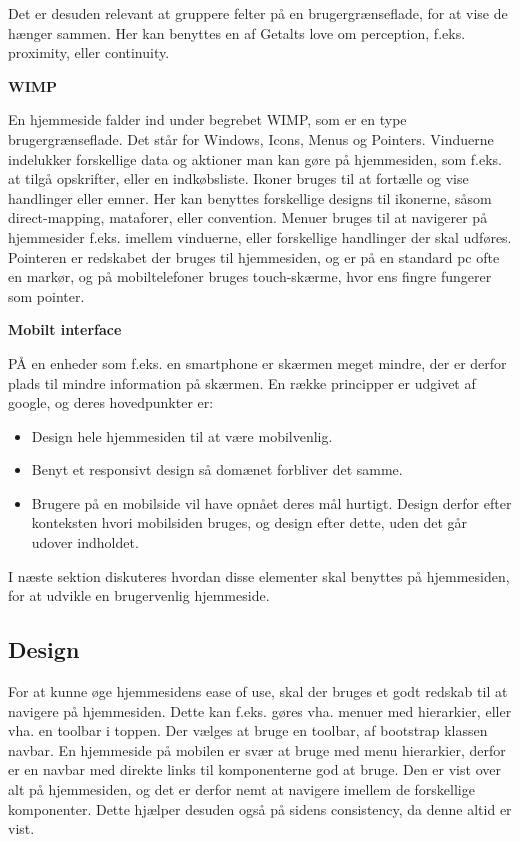 Det er desuden relevant at gruppere felter på en brugergrænseflade, for at vise de hænger sammen. Her kan benyttes en af Getalts love om perception, f.eks. proximity, eller continuity.

\textbf{WIMP}

En hjemmeside falder ind under begrebet WIMP, som er en type brugergrænseflade. Det står for Windows, Icons, Menus og Pointers.
Vinduerne indelukker forskellige data og aktioner man kan gøre på hjemmesiden, som f.eks. at tilgå opskrifter, eller en indkøbsliste.
Ikoner bruges til at fortælle og vise handlinger eller emner.
Her kan benyttes forskellige designs til ikonerne, såsom direct-mapping, mataforer, eller convention.
Menuer bruges til at navigerer på hjemmesider f.eks. imellem vinduerne, eller forskellige handlinger der skal udføres.
Pointeren er redskabet der bruges til hjemmesiden, og er på en standard pc ofte en markør, og på mobiltelefoner bruges touch-skærme, hvor ens fingre fungerer som pointer.


\textbf{Mobilt interface}

PÅ en enheder som f.eks. en smartphone er skærmen meget mindre, der er derfor plads til mindre information på skærmen. 
En række principper er udgivet af google\citep{Mobil}, og deres hovedpunkter er:
\begin{itemize}
	\item Design hele hjemmesiden til at være mobilvenlig.
	\item Benyt et responsivt design så domænet forbliver det samme.
	\item Brugere på en mobilside vil have opnået deres mål hurtigt. Design derfor efter konteksten hvori mobilsiden bruges, og design efter dette, uden det går udover indholdet.
\end{itemize}

I næste sektion diskuteres hvordan disse elementer skal benyttes på hjemmesiden, for at udvikle en brugervenlig hjemmeside.

\subsection{Design}

For at kunne øge hjemmesidens ease of use, skal der bruges et godt redskab til at navigere på hjemmesiden.
Dette kan f.eks. gøres vha. menuer med hierarkier, eller vha. en toolbar i toppen.
Der vælges at bruge en toolbar, af bootstrap klassen navbar. 
En hjemmeside på mobilen er svær at bruge med menu hierarkier, derfor er en navbar med direkte links til komponenterne god at bruge. 
Den er vist over alt på hjemmesiden, og det er derfor nemt at navigere imellem de forskellige komponenter.
Dette hjælper desuden også på sidens consistency, da denne altid er vist.

